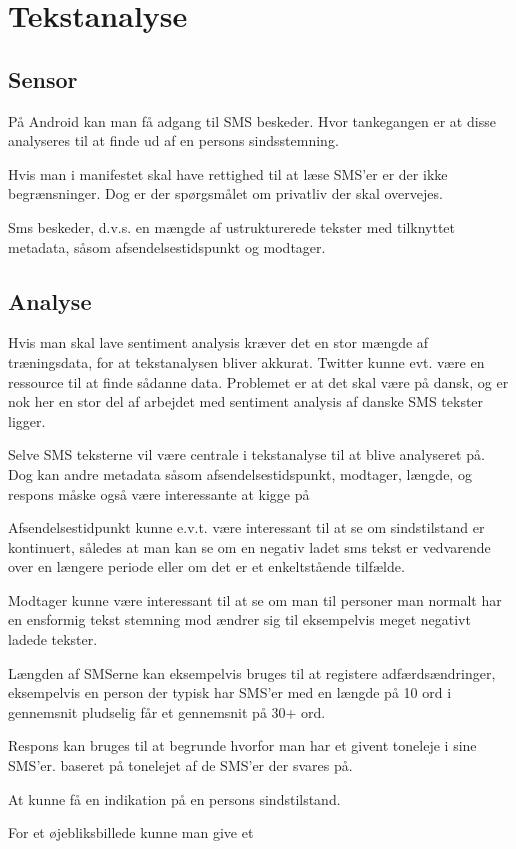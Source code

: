 \section{Tekstanalyse}
\subsection{Sensor}
	\begin{description}[style=nextline]
		\item[Kan vi få fat i data?]
		På Android kan man få adgang til SMS beskeder. Hvor tankegangen er at disse analyseres til at finde ud af en persons sindsstemning.
		\item[Er der begrænsninger]
		Hvis man i manifestet skal have rettighed til at læse SMS'er er der ikke begrænsninger.
		Dog er der spørgsmålet om privatliv der skal overvejes.
		\item[Hvilke data gives der?]
		Sms beskeder, d.v.s. en mængde af ustrukturerede tekster med tilknyttet metadata, såsom afsendelsestidspunkt og modtager.
	\end{description}
	
\subsection{Analyse}
	\begin{description}[style=nextline]
		\item[Har vi data nok?]
		Hvis man skal lave sentiment analysis kræver det en stor mængde af træningsdata, for at tekstanalysen bliver akkurat. Twitter kunne evt. være en ressource til at finde sådanne data. Problemet er at det skal være på dansk, og er nok her en stor del af arbejdet med sentiment analysis af danske SMS tekster ligger.
		\item[Hvilke data skal benyttes?]
		Selve SMS teksterne vil være centrale i tekstanalyse til at blive analyseret på.
		Dog kan andre metadata såsom afsendelsestidspunkt, modtager, længde, og respons måske også være interessante at kigge på
		
		Afsendelsestidpunkt kunne e.v.t. være interessant til at se om sindstilstand er kontinuert, således at man kan se om en negativ ladet sms tekst er vedvarende over en længere periode eller om det er et enkeltstående tilfælde.
		
		Modtager kunne være interessant til at se om man til personer man normalt har en ensformig tekst stemning mod ændrer sig til eksempelvis meget negativt ladede tekster.
		
		Længden af SMSerne kan eksempelvis bruges til at registere adfærdsændringer, eksempelvis en person der typisk har SMS'er med en længde på 10 ord i gennemsnit pludselig får et gennemsnit på 30+ ord.
		
		Respons kan bruges til at begrunde hvorfor man har et givent toneleje i sine SMS'er. baseret på tonelejet af de SMS'er der svares på.
		\item[Formål med analysen]
		At kunne få en indikation på en persons sindstilstand.
		\item[Idé til visualisering]
		For et øjebliksbillede kunne man give et 
	\end{description}